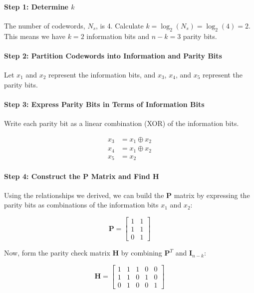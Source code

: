 \documentclass[10pt]{article}
\begin{document}
\paragraph{Step 1: Determine \( k \)}
The number of codewords, \( N_s \), is 4. Calculate \( k = \log_2(N_s) = \log_2(4) = 2 \). This means we have \( k = 2 \) information bits and \( n - k = 3 \) parity bits.

\paragraph{Step 2: Partition Codewords into Information and Parity Bits}
Let \( x_1 \) and \( x_2 \) represent the information bits, and \( x_3 \), \( x_4 \), and \( x_5 \) represent the parity bits.

\paragraph{Step 3: Express Parity Bits in Terms of Information Bits}
Write each parity bit as a linear combination (XOR) of the information bits.

\begin{align*}
    x_3 &= x_1 \oplus x_2 \\
    x_4 &= x_1 \oplus x_2 \\
    x_5 &= x_2
\end{align*}

\paragraph{Step 4: Construct the \( \mathbf{P} \) Matrix and Find \( \mathbf{H} \)}
Using the relationships we derived, we can build the \( \mathbf{P} \) matrix by expressing the parity bits as combinations of the information bits \( x_1 \) and \( x_2 \):

\[
\mathbf{P} = \begin{bmatrix} 1 & 1 \\ 1 & 1 \\ 0 & 1 \end{bmatrix}
\]

Now, form the parity check matrix \( \mathbf{H} \) by combining \( \mathbf{P}^T \) and \( \mathbf{I}_{n-k} \):

\[
\mathbf{H} = \begin{bmatrix} 1 & 1 & 1 & 0 & 0 \\ 1 & 1 & 0 & 1 & 0 \\ 0 & 1 & 0 & 0 & 1 \end{bmatrix}
\]
\end{document}
